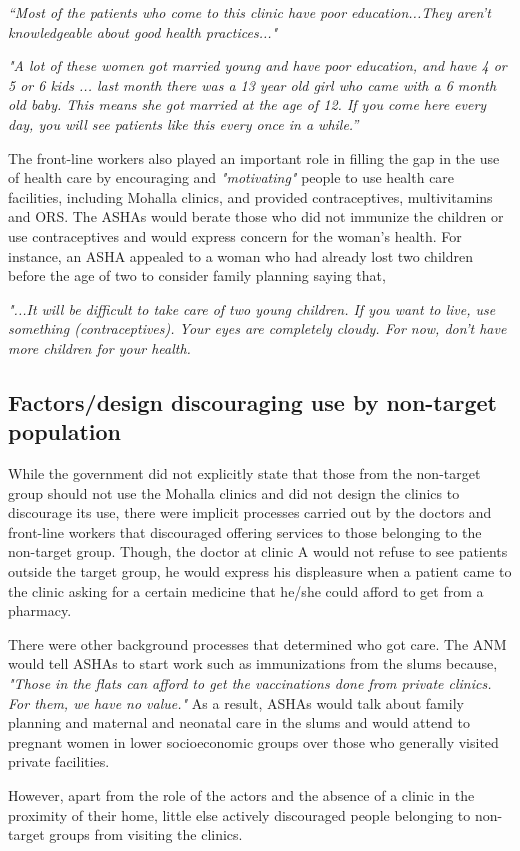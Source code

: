 \textit{“Most of the patients who come to this clinic have poor education...They aren’t knowledgeable about good health practices..."}

\textit{"A lot of these women got married young and have poor education, and have 4 or 5 or 6 kids ... last month there was a 13 year old girl who came with a 6 month old baby. This means she got married at the age of 12. If you come here every day, you will see patients like this every once in a while.”}

The front-line workers also played an important role in filling the gap in the use of health care by encouraging and \textit{"motivating"} people to use health care facilities, including Mohalla clinics, and provided contraceptives, multivitamins and ORS. The ASHAs would berate those who did not immunize the children or use contraceptives and would express concern for the woman's health. For instance, an ASHA appealed to a woman who had already lost two children before the age of two to consider family planning saying that, 

\textit{"...It will be difficult to take care of two young children. If you want to live, use something (contraceptives). Your eyes are completely cloudy. For now, don’t have more children for your health.}

\subsection{Factors/design discouraging use by non-target population}
While the government did not explicitly state that those from the non-target group should not use the Mohalla clinics and did not design the clinics to discourage its use, there were implicit processes carried out by the doctors and front-line workers that discouraged offering services to those belonging to the non-target group. Though, the doctor at clinic A would not refuse to see patients outside the target group, he would express his displeasure when a patient came to the clinic asking for a certain medicine that he/she could afford to get from a pharmacy.

There were other background processes that determined who got care. The ANM would tell ASHAs to start work such as immunizations from the slums because, \textit{"Those in the flats can afford to get the vaccinations done from private clinics. For them, we have no value."} As a result, ASHAs would talk about family planning and maternal and neonatal care in the slums and would attend to pregnant women in lower socioeconomic groups over those who generally visited private facilities.


However, apart from the role of the actors and the absence of a clinic in the proximity of their home, little else actively discouraged people belonging to non-target groups from visiting the clinics.